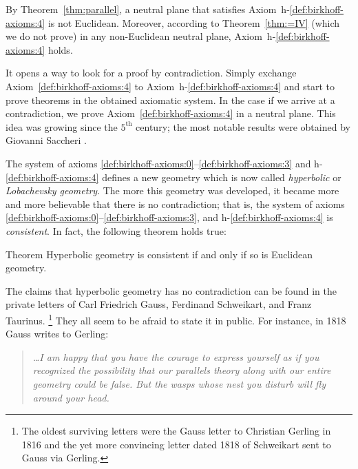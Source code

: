 By Theorem~\ref{thm:parallel}, a neutral plane that satisfies Axiom~h-$\!$\ref{def:birkhoff-axioms:4} is not Euclidean. 
Moreover, according to Theorem~\ref{thm:=IV} (which we do not prove) 
in any non-Euclidean neutral plane, Axiom~h-$\!$\ref{def:birkhoff-axioms:4} holds.

It opens a way to look for a proof by contradiction.
Simply exchange  Axiom~\ref{def:birkhoff-axioms:4} to Axiom~h-$\!$\ref{def:birkhoff-axioms:4}
 and start to prove theorems in the obtained axiomatic system.
In the case if we arrive at a contradiction, 
we prove Axiom~\ref{def:birkhoff-axioms:4} in a neutral plane.
This idea was growing since the $5^\text{th}$ century;
the most notable results were obtained by Giovanni Saccheri \cite{saccheri}.

The system of axioms \ref{def:birkhoff-axioms:0}--\ref{def:birkhoff-axioms:3} and h-$\!$\ref{def:birkhoff-axioms:4} defines a new geometry which is now called \emph{hyperbolic} or \emph{Lobachevsky  geometry}.
The more this geometry was developed,
it became more and more believable that there is no contradiction;
that is, the system of axioms \ref{def:birkhoff-axioms:0}--\ref{def:birkhoff-axioms:3}, and h-$\!$\ref{def:birkhoff-axioms:4} is \emph{consistent}.
In fact, the following theorem holds true:


\begin{thm}{Theorem}\label{thm:consistent}
Hyperbolic geometry is consistent if and only if so is Euclidean geometry.
\end{thm}

The claims
that hyperbolic geometry has no contradiction can be found in the private letters of
Carl Friedrich Gauss, 
Ferdinand  Schweikart, 
and Franz Taurinus.%
\footnote{The oldest surviving letters were the Gauss letter to Christian Gerling in 1816 
and the yet more convincing letter dated 1818 
of Schweikart sent to Gauss via Gerling.}
They all seem to be afraid to state it in public.
For instance, in 1818 Gauss writes to Gerling:

\smallskip

\begin{quotation}{\it
\dots I am happy that you have the courage to express yourself as if you recognized the possibility that our parallels theory along with our entire geometry could be false.
But the wasps whose nest you disturb will fly around your head.}
\end{quotation}

